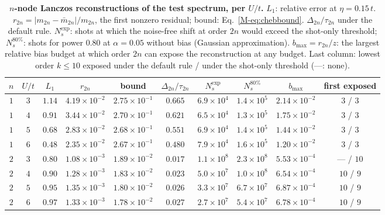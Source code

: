 \documentclass[aps,prb,onecolumn,superscriptaddress,longbibliography,floatfix]{revtex4-2}
\begin{document}
\begin{table}[htbp]
\caption{\label{tab:krylovfull}\textbf{$n$-node Lanczos reconstructions of the test spectrum, per $U/t$.} $L_1$: relative error at $\eta=0.15\,t$. $r_{2n}=|m_{2n}-\bar m_{2n}|/m_{2n}$, the first nonzero residual; bound: Eq.~\eqref{M-eq:chebbound}. $\Delta_{2n}/\tau_{2n}$ under the default rule. $N_s^{\mathrm{exp}}$: shots at which the noise-free shift at order $2n$ would exceed the shot-only threshold; $N_s^{80\%}$: shots for power $0.80$ at $\alpha=0.05$ without bias (Gaussian approximation). $b_{\max}=r_{2n}/z$: the largest relative bias budget at which order $2n$ can expose the reconstruction at any budget. Last column: lowest order $k\le10$ exposed under the default rule / under the shot-only threshold (---: none).}
\small
\begin{tabular}{cccccccccc}
\toprule
$n$ & $U/t$ & $L_1$ & $r_{2n}$ & bound & $\Delta_{2n}/\tau_{2n}$ & $N_s^{\mathrm{exp}}$ & $N_s^{80\%}$ & $b_{\max}$ & first exposed \\
\midrule
$1$ & $3$ & $1.14$ & $4.19\times10^{-2}$ & $2.75\times10^{-1}$ & $0.665$ & $6.9\times10^{4}$ & $1.4\times10^{5}$ & $2.14\times10^{-2}$ & $3$ / $3$ \\
$1$ & $4$ & $0.91$ & $3.44\times10^{-2}$ & $2.70\times10^{-1}$ & $0.621$ & $6.5\times10^{4}$ & $1.3\times10^{5}$ & $1.75\times10^{-2}$ & $3$ / $3$ \\
$1$ & $5$ & $0.68$ & $2.83\times10^{-2}$ & $2.68\times10^{-1}$ & $0.551$ & $6.9\times10^{4}$ & $1.4\times10^{5}$ & $1.44\times10^{-2}$ & $3$ / $3$ \\
$1$ & $6$ & $0.48$ & $2.35\times10^{-2}$ & $2.67\times10^{-1}$ & $0.480$ & $7.9\times10^{4}$ & $1.6\times10^{5}$ & $1.20\times10^{-2}$ & $3$ / $3$ \\
$2$ & $3$ & $0.80$ & $1.08\times10^{-3}$ & $1.89\times10^{-2}$ & $0.017$ & $1.1\times10^{8}$ & $2.3\times10^{8}$ & $5.53\times10^{-4}$ & --- / $10$ \\
$2$ & $4$ & $0.90$ & $1.28\times10^{-3}$ & $1.83\times10^{-2}$ & $0.023$ & $5.0\times10^{7}$ & $1.0\times10^{8}$ & $6.54\times10^{-4}$ & $10$ / $9$ \\
$2$ & $5$ & $0.95$ & $1.35\times10^{-3}$ & $1.80\times10^{-2}$ & $0.026$ & $3.3\times10^{7}$ & $6.7\times10^{7}$ & $6.87\times10^{-4}$ & $10$ / $9$ \\
$2$ & $6$ & $0.97$ & $1.33\times10^{-3}$ & $1.78\times10^{-2}$ & $0.027$ & $2.7\times10^{7}$ & $5.4\times10^{7}$ & $6.78\times10^{-4}$ & $10$ / $9$ \\

\end{tabular}
\end{table}
\end{document}
